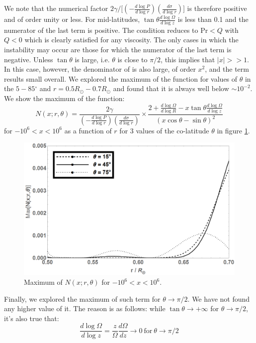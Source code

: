 \documentclass[12pt]{article}
\newcommand{\degree}{\ensuremath{^\circ}}
\begin{document}
We note that the numerical factor $2 \gamma / \Big[  ( - \frac{d \log P}{d \log r}) (\frac{d \sigma}{d \log r}) \Big]$ is therefore positive and of order unity or less. For mid-latitudes, $\tan \theta \frac{d \log \Omega}{d \log z}$ is less than 0.1 and the numerator of the last term is positive. The condition reduces to $\text{Pr} < Q$ with $Q < 0$ which is clearly satisfied for any viscosity. The only cases in which the instability may occur are those for which the numerator of the last term is negative. Unless $\tan \theta$ is large, i.e. $\theta$ is close to $\pi/2$, this implies that $|x| >> 1$.  In this case, however, the denominator of is also large, of order $x^2$, and the term results small overall. We explored the maximum of the function for values of $\theta$ in the $5 - 85 \degree$ and $r = 0.5 R_\odot - 0.7 R_\odot$ and found that it is always well below $\sim 10^{-2}$. We show the maximum of the function:
\begin{equation}
N(x; r, \theta) = \frac{2 \gamma}{ ( - \frac{d \log P}{d \log r}) (\frac{d \sigma}{d \log r})} \times \frac{2 + \frac{d \log \Omega}{d \log R} - x \tan{\theta} \frac{d \log \Omega}{d \log z}}{ (x \cos \theta - \sin \theta)^2} 
\end{equation}
for $- 10^6 < x < 10^6$ as a function of $r$ for 3 values of the co-latitude $\theta$ in figure \ref{figNumFact}.
\begin{figure}
	\centering
	\includegraphics[width=\textwidth, clip=true, trim=0cm 0cm 0cm 0cm]{picNumFact.png}			
	\caption{\label{figNumFact}Maximum of $N(x; r, \theta)$ for $- 10^6 < x < 10^6$.}
\end{figure}

Finally, we explored the maximum of such term for $\theta \rightarrow \pi/2$. We have not found any higher value of it. The reason is as follows: while $\tan \theta \rightarrow + \infty$ for $\theta \rightarrow \pi/2$, it's also true that:
\begin{equation}
\frac{d \log \Omega}{d \log z} = \frac{z}{\Omega} \frac{d \Omega}{dz} \rightarrow 0  \ \text{for} \  \theta \rightarrow \pi/2
\end{equation}
\end{document}
